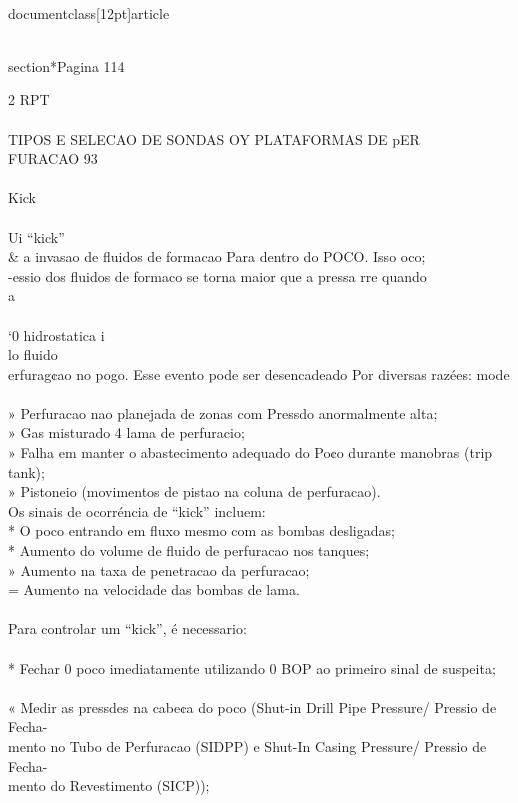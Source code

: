 \\documentclass[12pt]{article}
\begin{document}
\\section*{Pagina 114}

2 RPT\\
\\
TIPOS E SELECAO DE SONDAS OY PLATAFORMAS DE pER\\
FURACAO 93\\
\\
Kick\\
\\
Ui “kick” \\& a invasao de fluidos de formacao Para dentro do POCO. Isso oco;\\
-essio dos fluidos de formaco se torna maior que a pressa rre quando\\
a\\
\\
‘0 hidrostatica i\\
lo fluido\\
erfurag¢ao no pogo. Esse evento pode ser desencadeado Por diversas razées: mode\\
\\
» Perfuracao nao planejada de zonas com Pressdo anormalmente alta;\\
» Gas misturado 4 lama de perfuracio;\\
» Falha em manter o abastecimento adequado do Po¢o durante manobras (trip tank);\\
» Pistoneio (movimentos de pistao na coluna de perfuracao).\\
Os sinais de ocorréncia de “kick” incluem:\\
* O poco entrando em fluxo mesmo com as bombas desligadas;\\
* Aumento do volume de fluido de perfuracao nos tanques;\\
» Aumento na taxa de penetracao da perfuracao;\\
= Aumento na velocidade das bombas de lama.\\
\\
Para controlar um “kick”, é necessario:\\
\\
* Fechar 0 poco imediatamente utilizando 0 BOP ao primeiro sinal de suspeita;\\
\\
« Medir as pressdes na cabe¢a do poco (Shut-in Drill Pipe Pressure/ Pressio de Fecha-\\
mento no Tubo de Perfuracao (SIDPP) e Shut-In Casing Pressure/ Pressio de Fecha-\\
mento do Revestimento (SICP));\\
\end{document}
